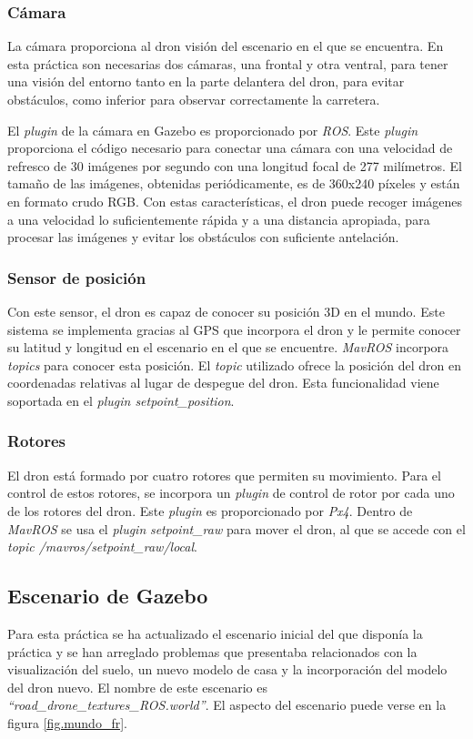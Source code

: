 \subsubsection{Cámara}
La cámara proporciona al dron visión del escenario en el que se encuentra. En esta práctica son necesarias dos cámaras, una frontal y otra ventral, para tener una visión del entorno tanto en la parte delantera del dron, para evitar obstáculos, como inferior para observar correctamente la carretera.

El \textit{plugin} de la cámara en Gazebo es proporcionado por \textit{ROS}. Este \textit{plugin} proporciona el código necesario para conectar una cámara con una velocidad de refresco de 30 imágenes por segundo con una longitud focal de 277 milímetros. El tamaño de las imágenes, obtenidas periódicamente, es de 360x240 píxeles y están en formato crudo RGB. Con estas características, el dron puede recoger imágenes a una velocidad lo suficientemente rápida y a una distancia apropiada, para procesar las imágenes y evitar los obstáculos con suficiente antelación.

\subsubsection{Sensor de posición}
Con este sensor, el dron es capaz de conocer su posición 3D en el mundo. Este sistema se implementa gracias al GPS que incorpora el dron y le permite conocer su latitud y longitud en el escenario en el que se encuentre. \textit{MavROS} incorpora \textit{topics} para conocer esta posición. El \textit{topic} utilizado ofrece la posición del dron en coordenadas relativas al lugar de despegue del dron. Esta funcionalidad viene soportada en el \textit{plugin setpoint\_position}.

\subsubsection{Rotores}
El dron está formado por cuatro rotores que permiten su movimiento. Para el control de estos rotores, se incorpora un \textit{plugin} de control de rotor por cada uno de los rotores del dron. Este \textit{plugin} es proporcionado por \textit{Px4}. Dentro de \textit{MavROS} se usa el \textit{plugin} \textit{setpoint\_raw} para mover el dron, al que se accede con el \textit{topic /mavros/setpoint\_raw/local}. 

\subsection{Escenario de Gazebo}
Para esta práctica se ha actualizado el escenario inicial del que disponía la práctica y se han arreglado problemas que presentaba relacionados con la visualización del suelo, un nuevo modelo de casa y la incorporación del modelo del dron nuevo. El nombre de este escenario es \textit{``road\_drone\_textures\_ROS.world''}. El aspecto del escenario puede verse en la figura \ref{fig.mundo_fr}.

